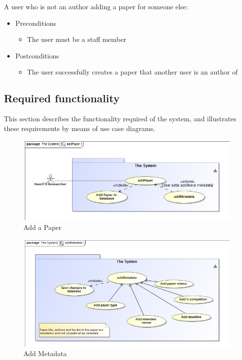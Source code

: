 \documentclass[a4paper,12pt]{article}
\begin{document}
A user who is not an author adding a paper for someone else:
\begin{itemize}
    \item Preconditions
    \begin{itemize}
        \item The user must be a staff member
    \end{itemize}
    \item Postconditions
    \begin{itemize}
        \item The user successfully creates a paper that another user is an author of
    \end{itemize}
\end{itemize}

\newpage
\subsection{Required functionality}

This section describes the functionality required of the system, and illustrates these requirements by means of use case diagrams.

\begin{figure}[H]
    \centering
    \caption{Add a Paper}
    \includegraphics[width=1\textwidth]{req-func/uc__The_System__addPaper.jpg}
\end{figure}

\begin{figure}[H]
    \centering
    \caption{Add Metadata}
    \includegraphics[width=1\textwidth]{req-func/uc__The_System__addMetadata.jpg}
\end{figure}
\end{document}
